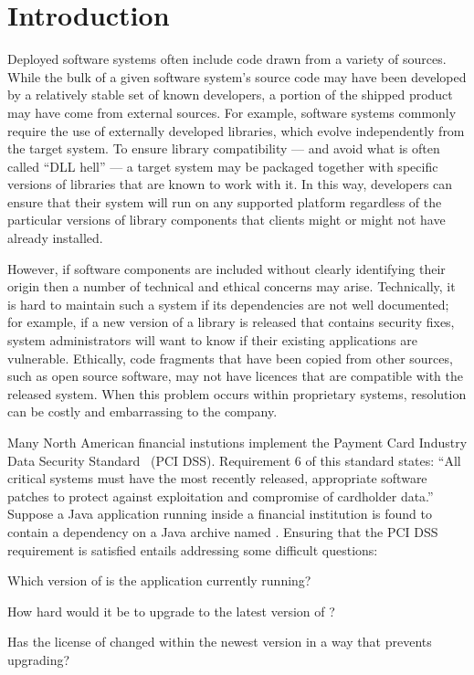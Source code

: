 \section{Introduction{\label{sec:introduction}}}

Deployed software systems often include code drawn from a
variety of sources.  While the bulk of a given software system's
source code may have been developed by a relatively stable set of known
developers, a portion of the shipped product may have come from
external sources.  For example, software systems commonly require the use
of externally developed libraries, which evolve independently from the
target system.  To ensure library compatibility --- and avoid what is often
called ``DLL hell'' --- a target system may be packaged together with
specific versions of libraries that are known to work with it.  In this
way, developers can ensure that their system will run on any supported
platform regardless of the particular versions of library components that
clients might or might not have already installed.

However, if software components are included without clearly identifying
their origin then a number of technical and ethical concerns may arise.
Technically, it is hard to maintain such a system if its dependencies are
not well documented; for example, if a new version of a library is released
that contains security fixes, system administrators will want to know if
their existing applications are vulnerable.  Ethically, code fragments that
have been copied from other sources, such as open source software, may not
have licences that are compatible with the released system.  When this problem
occurs within proprietary systems, resolution can be costly and
embarrassing to the company.

Many North American financial instutions implement the Payment Card
Industry Data Security Standard~\cite{PCI_DSS_121} (PCI DSS).  Requirement
6 of this standard states: ``All critical systems must have the most
recently released, appropriate software patches to protect against
exploitation and compromise of cardholder data.''  Suppose a Java
application running inside a financial institution is found to contain a
dependency on a Java archive named .  Ensuring that
the PCI DSS requirement is satisfied entails addressing some difficult
questions:

\begin{compactitem}
\item  Which version of  is the application
    currently running?

\item How hard would it be to upgrade to the latest version of
    ?

\item Has the license of  changed within the newest
    version in a way that prevents upgrading?

\end{compactitem}

